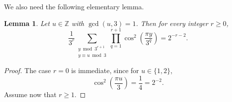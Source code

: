 \documentclass[amssymb,amsfonts,refcheck,12pt,verbatim,righttag]{amsart}
\numberwithin{equation}{section} %
\newtheorem{lem}[thm]{Lemma}
\newcommand{\Z}{\mathbb{Z}}
\theoremstyle{plain}
\begin{document}
We also need the following elementary lemma.

\begin{lem}\label{lemaverageCOS2}
	Let $u\in\Z$ with $\gcd(u,3)=1$. Then  for every integer $r\ge 0$,
	\begin{equation*}
		\frac{1}{3^r}\sum_{\substack{y\bmod 3^{r+1}\\ y\equiv u\bmod 3}}
		\prod_{q=1}^{r+1}
		\cos^2\left(\frac{\pi y}{3^q}\right)
		=2^{-r-2}.
	\end{equation*}
\end{lem}

\begin{proof}
The case \(r=0\) is immediate, since for $u\in \{1,2\}$, 
\begin{equation}\label{eqcos222}
\cos^2\left(\frac{\pi u}{3}\right)=\frac14=2^{-2}.
\end{equation}
Assume now that \(r\ge 1\).	



\end{proof}
\end{document}
